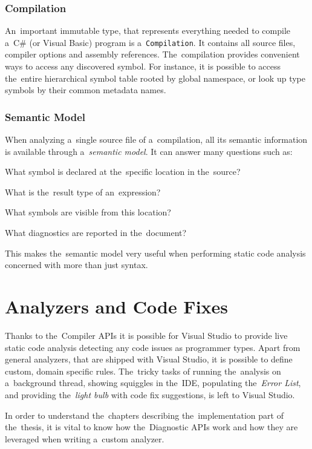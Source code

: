 \documentclass[
  digital, %
  table,   %
  lof,     %
  lot,     %
  oneside,
]{fithesis3}
\begin{document}
\subsubsection{\textbf{Compilation}}
An~important immutable type, that represents everything needed to compile a~C\# (or Visual Basic) program is a~\texttt{Compilation}. It contains all source files, compiler options and assembly references. The~compilation provides convenient ways to access any discovered symbol. For instance, it is possible to access the~entire hierarchical symbol table rooted by global namespace, or look up type symbols by their common metadata names.

\subsubsection{\textbf{Semantic Model}}
When analyzing a~single source file of a~compilation, all its semantic information is available through a~\textit{semantic model}. It can answer many questions such as:
  \begin{compactitem}
  \item What symbol is declared at the~specific location in the~source?
  \item What is the~result type of an~expression?
  \item What symbols are visible from this location?
  \item What diagnostics are reported in the~document?
  \end{compactitem}
 
This makes the~semantic model very useful when performing static code analysis concerned with more than just syntax.
 
\section{Analyzers and Code Fixes}
\label{sec:analyzers-and-code-fixes}
Thanks to the~Compiler APIs it is possible for Visual Studio to provide live static code analysis detecting any code issues as programmer types. Apart from general analyzers, that are shipped with Visual Studio, it is possible to define custom, domain specific rules. The~tricky tasks of running the~analysis on a~background thread, showing squiggles in the~IDE, populating the~\textit{Error List}, and providing the~\textit{light bulb} with code fix suggestions, is left to Visual Studio.

In order to understand the~chapters describing the~implementation part of the~thesis, it is vital to know how the~Diagnostic APIs work and how they are leveraged when writing a~custom analyzer.
\end{document}
